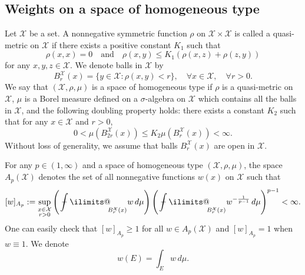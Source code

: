 \documentclass[reqno]{amsart}
\numberwithin{equation}{section}
\theoremstyle{plain}
\theoremstyle{definition}
\theoremstyle{remark}
\begin{document}
\subsection{Weights on a space of homogeneous type}		\label{161006@sec1}

Let ${\mathcal{X}}$ be a set. 
A nonnegative symmetric function $\rho$ on ${\mathcal{X}}\times {\mathcal{X}}$ is called a quasi-metric on ${\mathcal{X}}$ if there exists a positive constant $K_1$ such that
$$
\rho(x,x)=0\quad \text{and}\quad \rho(x,y)\le K_1\left(\rho(x,z)+\rho(z,y) \right)
$$
for any $x,y,z\in {\mathcal{X}}$.
We denote balls in ${\mathcal{X}}$ by
\begin{equation}
							\label{eq0624_01}
B_r^{\mathcal{X}}(x)=\{y\in {\mathcal{X}}:\rho(x,y)<r\}, \quad \forall x\in {\mathcal{X}}, \quad \forall r>0.
\end{equation}
We say that $({\mathcal{X}},\rho,\mu)$ is a space of homogeneous type if $\rho$ is a quasi-metric on ${\mathcal{X}}$, $\mu$ is a Borel measure defined on a $\sigma$-algebra on ${\mathcal{X}}$ which contains all the balls in ${\mathcal{X}}$, and the following doubling property holds: there exists a constant $K_2$ such that for any $x\in {\mathcal{X}}$ and $r>0$, 
$$
0<\mu(B_{2r}^{\mathcal{X}}(x))\le K_2\mu(B_r^{\mathcal{X}}(x))<\infty.
$$
Without loss of generality, we assume that balls $B_r^{\mathcal{X}}(x)$ are open in ${\mathcal{X}}$.

For any $p\in (1,\infty)$ and a space of homogeneous type $({\mathcal{X}},\rho,\mu)$, the space $A_p({\mathcal{X}})$ denotes the set of all nonnegative functions $w(x)$ on ${\mathcal{X}}$ such that 
$$
[w]_{A_p}:=\sup_{\substack{x\in {\mathcal{X}} \\ r>0}}\left({\operatorname{\,\,\text{\bf--}\kern-.98em\DOTSI\intop\ilimits@\!\!}}_{B_r^{\mathcal{X}}(x)}w\,d\mu \right)\left({\operatorname{\,\,\text{\bf--}\kern-.98em\DOTSI\intop\ilimits@\!\!}}_{B_r^{\mathcal{X}}(x)}w^{-\frac{1}{p-1}}\,d\mu\right)^{p-1}<\infty.
$$
One can easily check that  $[w]_{A_p} \ge 1$ for all $w \in A_p({\mathcal{X}})$ and $[w]_{A_p}=1$ when $w\equiv1$.
We denote
\[
w(E)=\int_E w \, d\mu.
\]
\end{document}
